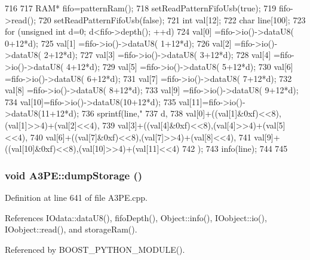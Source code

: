 \begin{DoxyCode}
716                       {
717   RAM* fifo=patternRam();
718   setReadPatternFifoUsb(true);
719   fifo->read();
720   setReadPatternFifoUsb(false);
721   int val[12];
722   char line[100];
723   for (unsigned int d=0; d<fifo->depth(); ++d){
724     val[0] =fifo->io()->dataU8( 0+12*d);
725     val[1] =fifo->io()->dataU8( 1+12*d);
726     val[2] =fifo->io()->dataU8( 2+12*d);
727     val[3] =fifo->io()->dataU8( 3+12*d);
728     val[4] =fifo->io()->dataU8( 4+12*d);
729     val[5] =fifo->io()->dataU8( 5+12*d);
730     val[6] =fifo->io()->dataU8( 6+12*d);
731     val[7] =fifo->io()->dataU8( 7+12*d);
732     val[8] =fifo->io()->dataU8( 8+12*d);
733     val[9] =fifo->io()->dataU8( 9+12*d);
734     val[10]=fifo->io()->dataU8(10+12*d);
735     val[11]=fifo->io()->dataU8(11+12*d);
736     sprintf(line,"%
737         d,
738         val[0]+((val[1]&0xf)<<8),(val[1]>>4)+(val[2]<<4),
739         val[3]+((val[4]&0xf)<<8),(val[4]>>4)+(val[5]<<4),
740         val[6]+((val[7]&0xf)<<8),(val[7]>>4)+(val[8]<<4),
741         val[9]+((val[10]&0xf)<<8),(val[10]>>4)+(val[11]<<4)
742         );
743     info(line);
744   }
745 }
\end{DoxyCode}
\hypertarget{classA3PE_ad7999557f9d561dec67526730a3c97ef}{
\subsubsection[{dumpStorage}]{\setlength{\rightskip}{0pt plus 5cm}void A3PE::dumpStorage ()}}
\label{classA3PE_ad7999557f9d561dec67526730a3c97ef}


Definition at line 641 of file A3PE.cpp.

References IOdata::dataU8(), fifoDepth(), Object::info(), IOobject::io(), IOobject::read(), and storageRam().

Referenced by BOOST\_\-PYTHON\_\-MODULE().


